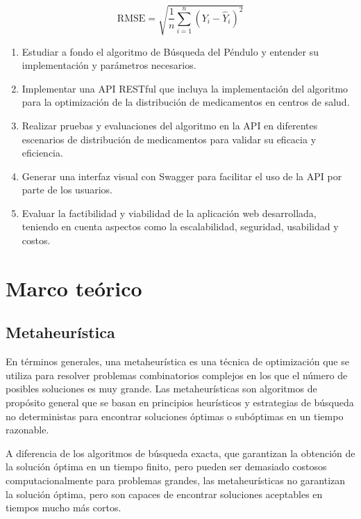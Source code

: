 \documentclass[conference]{IEEEtran}
\begin{document}
\begin{equation}
\text{RMSE} = \sqrt{\frac{1}{n} \sum_{i=1}^{n} (Y_i - \hat{Y}_i)^2}
\end{equation}


\begin{enumerate}
    \item Estudiar a fondo el algoritmo de Búsqueda del Péndulo y entender su
          implementación y parámetros necesarios.
    \item Implementar una API RESTful que incluya la implementación del
          algoritmo para la optimización de la distribución de medicamentos en
          centros de
          salud.
    \item Realizar pruebas y evaluaciones del algoritmo en la API en diferentes
          escenarios de distribución de medicamentos para validar su eficacia y
          eficiencia.
    \item Generar una interfaz visual con Swagger para facilitar el uso de la
          API por parte de los usuarios.
    \item Evaluar la factibilidad y viabilidad de la aplicación web
          desarrollada, teniendo en cuenta aspectos como la escalabilidad,
          seguridad,
          usabilidad y costos.
\end{enumerate}

\section{Marco teórico}
\label{sec:MT}

\subsection{Metaheurística}
En términos generales, una metaheurística es una técnica de optimización que se
utiliza para resolver problemas combinatorios complejos en los que el número de
posibles soluciones es muy grande. Las metaheurísticas son algoritmos de
propósito general que se basan en principios heurísticos y estrategias de
búsqueda no deterministas para encontrar soluciones óptimas o subóptimas en un
tiempo razonable.

A diferencia de los algoritmos de búsqueda exacta, que garantizan la obtención
de la solución óptima en un tiempo finito, pero pueden ser demasiado costosos
computacionalmente para problemas grandes, las metaheurísticas no garantizan la
solución óptima, pero son capaces de encontrar soluciones aceptables en tiempos
mucho más cortos.
\end{document}
